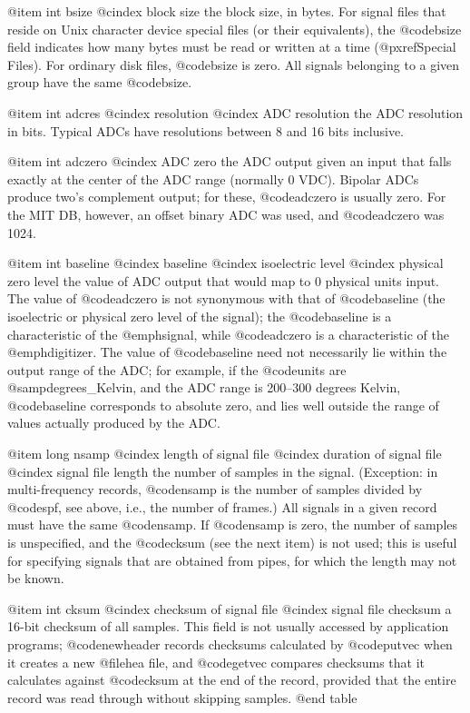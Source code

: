 {{{{{{{{{{@item int bsize
@cindex block size
the block size, in bytes.  For signal files that reside on Unix character
device special files (or their equivalents), the @code{bsize} field
indicates how many bytes must be read or written at a time
(@pxref{Special Files}).  For ordinary disk files, @code{bsize} is zero.
All signals belonging to a given group have the same
@code{bsize}.

@item int adcres
@cindex resolution
@cindex ADC resolution
the ADC resolution in bits.  Typical ADCs have resolutions between 8 and 16
bits inclusive.

@item int adczero
@cindex ADC zero
the ADC output given an input that falls exactly at the center of the
ADC range (normally 0 VDC).  Bipolar ADCs produce two's complement
output; for these, @code{adczero} is usually zero.  For the MIT DB,
however, an offset binary ADC was used, and @code{adczero} was 1024.

@item int baseline
@cindex baseline
@cindex isoelectric level
@cindex physical zero level
the value of ADC output that would map to 0 physical units input.
The value of @code{adczero} is not synonymous with that of
@code{baseline} (the isoelectric or physical zero level of the signal);  the
@code{baseline} is a characteristic of the @emph{signal}, while
@code{adczero} is a characteristic of the @emph{digitizer}.  The value
of @code{baseline} need not necessarily lie within the output range of
the ADC;  for example, if the @code{units} are @samp{degrees_Kelvin},
and the ADC range is 200--300 degrees Kelvin, @code{baseline} corresponds to 
absolute zero, and lies well outside the range of values actually produced
by the ADC.

@item long nsamp
@cindex length of signal file
@cindex duration of signal file
@cindex signal file length
the number of samples in the signal.  (Exception: in multi-frequency records,
@code{nsamp} is the number of samples divided by @code{spf}, see above, i.e.,
the number of frames.)  All signals in a given record must have the same
@code{nsamp}.  If @code{nsamp} is zero, the number of samples is unspecified,
and the @code{cksum} (see the next item) is not used; this is useful for
specifying signals that are obtained from pipes, for which the length may not
be known.

@item int cksum
@cindex checksum of signal file
@cindex signal file checksum
a 16-bit checksum of all samples.  This field is not usually accessed by
application programs; @code{newheader} records checksums calculated by
@code{putvec} when it creates a new @file{hea} file, and
@code{getvec} compares checksums that it calculates against @code{cksum}
at the end of the record, provided that the entire record was read
through without skipping samples.
@end table

}}}}}}}}}}
